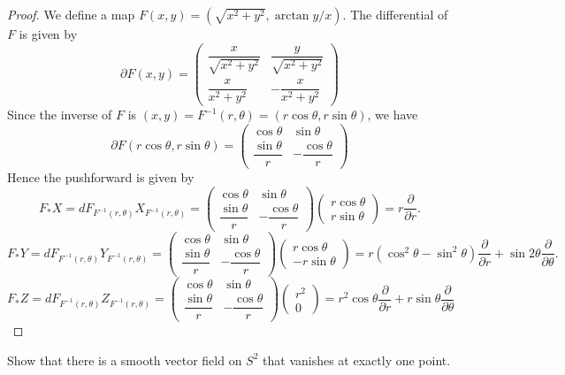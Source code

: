 \begin{proof}
We define a map $F(x,y)=(\sqrt{x^2+y^2},\arctan y/x)$. The differential of $F$ is given by
\[\partial F(x,y)=\begin{pmatrix}
\dfrac{x}{\sqrt{x^2+y^2}}&\dfrac{y}{\sqrt{x^2+y^2}}\\[8pt]
\dfrac{x}{x^2+y^2}&-\dfrac{x}{x^2+y^2}
\end{pmatrix}\]
Since the inverse of $F$ is $(x,y)=F^{-1}(r,\theta)=(r\cos\theta,r\sin\theta)$, we have
\[\partial F(r\cos\theta,r\sin\theta)=\begin{pmatrix}
\cos\theta&\sin\theta\\
\dfrac{\sin\theta}{r}&-\dfrac{\cos\theta}{r}
\end{pmatrix}\]
Hence the pushforward is given by
\[F_*X=dF_{F^{-1}(r,\theta)}X_{F^{-1}(r,\theta)}=\begin{pmatrix}
\cos\theta&\sin\theta\\
\dfrac{\sin\theta}{r}&-\dfrac{\cos\theta}{r}
\end{pmatrix}\begin{pmatrix}
r\cos\theta\\
r\sin\theta
\end{pmatrix}=r\frac{\partial}{\partial r}.\]
\[F_*Y=dF_{F^{-1}(r,\theta)}Y_{F^{-1}(r,\theta)}=\begin{pmatrix}
\cos\theta&\sin\theta\\
\dfrac{\sin\theta}{r}&-\dfrac{\cos\theta}{r}
\end{pmatrix}\begin{pmatrix}
r\cos\theta\\
-r\sin\theta
\end{pmatrix}=r(\cos^2\theta-\sin^2\theta)\frac{\partial}{\partial r}+\sin2\theta\frac{\partial}{\partial\theta}.\]
\[F_*Z=dF_{F^{-1}(r,\theta)}Z_{F^{-1}(r,\theta)}=\begin{pmatrix}
\cos\theta&\sin\theta\\
\dfrac{\sin\theta}{r}&-\dfrac{\cos\theta}{r}
\end{pmatrix}\begin{pmatrix}
r^2\\
0
\end{pmatrix}=r^2\cos\theta\frac{\partial}{\partial r}+r\sin\theta\frac{\partial}{\partial\theta}\]
\end{proof}
\begin{exercise}
Show that there is a smooth vector field on $S^2$ that vanishes at exactly one point.
\end{exercise}
